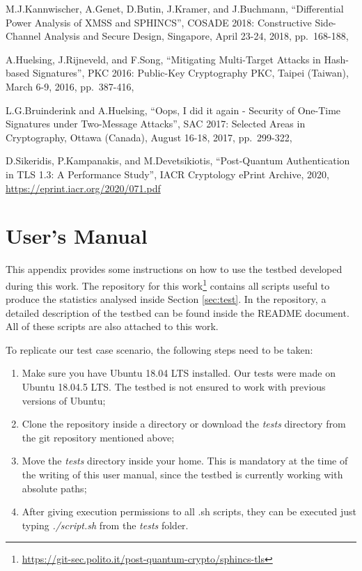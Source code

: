 \documentclass[a4paper,12pt]{article}
\begin{document}
\begin{thebibliography}{99}
M.J.Kannwischer, A.Genet, D.Butin, J.Kramer, and J.Buchmann,
``Differential Power Analysis of XMSS and SPHINCS'',
COSADE 2018: Constructive Side-Channel Analysis and Secure Design,
Singapore,
April 23-24, 2018,
pp.~168-188,

A.Huelsing, J.Rijneveld, and F.Song,
``Mitigating Multi-Target Attacks in Hash-based Signatures'',
PKC 2016: Public-Key Cryptography PKC,
Taipei (Taiwan),
March 6-9, 2016,
pp.~387-416,

L.G.Bruinderink and A.Huelsing,
``Oops, I did it again - Security of One-Time Signatures under Two-Message Attacks'',
SAC 2017: Selected Areas in Cryptography,
Ottawa (Canada),
August 16-18, 2017,
pp.~299-322,

D.Sikeridis, P.Kampanakis, and M.Devetsikiotis,
``Post-Quantum Authentication in TLS 1.3: A Performance Study'',
IACR Cryptology ePrint Archive,
2020,
\url{https://eprint.iacr.org/2020/071.pdf}

\end{thebibliography}

\appendix

\section{User's Manual}
\label{sec:usermanual}

This appendix provides some instructions on how to use the testbed developed during this work. 
The repository for this work\footnote{\url{https://git-sec.polito.it/post-quantum-crypto/sphincs-tls}} contains all scripts useful to produce the statistics analysed inside Section \ref{sec:test}.
In the repository, a detailed description of the testbed can be found inside the README document.
All of these scripts are also attached to this work.

To replicate our test case scenario, the following steps need to be taken: 
\begin{enumerate}
    \item Make sure you have Ubuntu 18.04 LTS installed. Our tests were made on Ubuntu 18.04.5 LTS. The testbed is not ensured to work with previous versions of Ubuntu;
    \item Clone the repository inside a directory or download the \textit{tests} directory from the git repository mentioned above;
    \item Move the \textit{tests} directory inside your home. This is mandatory at the time of the writing of this user manual, since the testbed is currently working with absolute paths;
    \item After giving execution permissions to all .sh scripts, they can be executed just typing \textit{./script.sh} from the \textit{tests} folder.
\end{enumerate}
\end{document}
